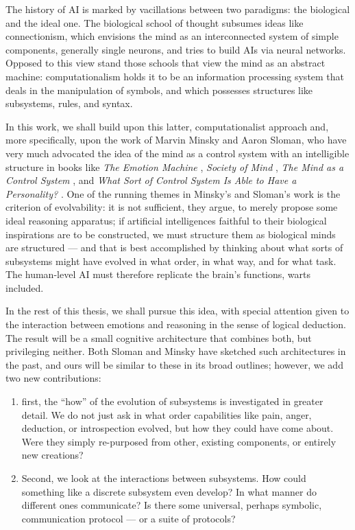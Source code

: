 The history of AI is marked by vacillations between two paradigms: the biological and the ideal one. The biological school of thought subsumes ideas like connectionism, which envisions the mind as an interconnected system of simple components, generally single neurons, and tries to build AIs via neural networks. Opposed to this view stand those schools that view the mind as an abstract machine: computationalism holds it to be an information processing system that deals in the manipulation of symbols, and which possesses structures like subsystems, rules, and syntax.

In this work, we shall build upon this latter, computationalist approach and, more specifically, upon the work of Marvin Minsky and Aaron Sloman, who have very much advocated the idea of the mind as a control system with an intelligible structure in books like {\em The Emotion Machine} \cite{emotionMachine}, {\em Society of Mind} \cite{societyOfMind}, {\em The Mind as a Control System} \cite{sloman1993}, and {\em What Sort of Control System Is Able to Have a Personality?} \cite{sloman1997}. One of the running themes in Minsky's and Sloman's work is the criterion of evolvability: it is not sufficient, they argue, to merely propose some ideal reasoning apparatus; if artificial intelligences faithful to their biological inspirations are to be constructed, we must structure them as biological minds are structured --- and that is best accomplished by thinking about what sorts of subsystems might have evolved in what order, in what way, and for what task. The human-level AI must therefore replicate the brain's functions, warts included.

In the rest of this thesis, we shall pursue this idea, with special attention given to the interaction between emotions and reasoning in the sense of logical deduction. The result will be a small cognitive architecture that combines both, but privileging neither. Both Sloman and Minsky have sketched such architectures in the past, and ours will be similar to these in its broad outlines; however, we add two new contributions:

\begin{enumerate}
	\item first, the ``how'' of the evolution of subsystems is investigated in greater detail. We do not just ask in what order capabilities like pain, anger, deduction, or introspection evolved, but how they could have come about. Were they simply re-purposed from other, existing components, or entirely new creations?
	\item Second, we look at the interactions between subsystems. How could something like a discrete subsystem even develop? In what manner do different ones communicate? Is there some universal, perhaps symbolic, communication protocol --- or a suite of protocols?
\end{enumerate} 

